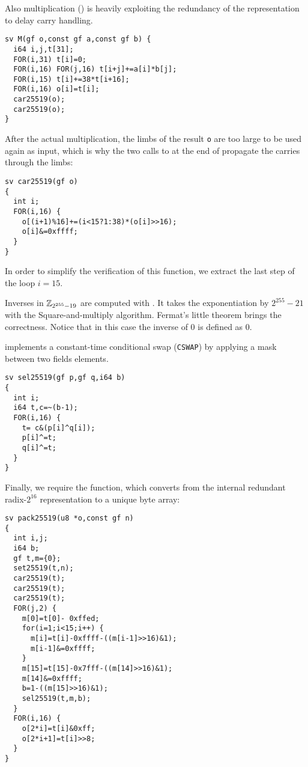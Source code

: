 Also multiplication () is heavily exploiting the redundancy
of the representation to delay carry handling.
\begin{lstlisting}[language=Ctweetnacl]
sv M(gf o,const gf a,const gf b) {
  i64 i,j,t[31];
  FOR(i,31) t[i]=0;
  FOR(i,16) FOR(j,16) t[i+j]+=a[i]*b[j];
  FOR(i,15) t[i]+=38*t[i+16];
  FOR(i,16) o[i]=t[i];
  car25519(o);
  car25519(o);
}
\end{lstlisting}

After the actual multiplication, the limbs of the result \texttt{o} are
too large to be used again as input, which is why the two calls to
 at the end of  propagate the carries through the limbs:
\begin{lstlisting}[language=Ctweetnacl]
sv car25519(gf o)
{
  int i;
  FOR(i,16) {
    o[(i+1)%16]+=(i<15?1:38)*(o[i]>>16);
    o[i]&=0xffff;
  }
}
\end{lstlisting}

In order to simplify the verification of this function,
we extract the last step of the loop $i = 15$.

Inverses in $\mathbb{Z}_{2^{255}-19}$ are computed with .
It takes the exponentiation by $2^{255}-21$ with the Square-and-multiply algorithm.
Fermat's little theorem brings the correctness.
Notice that in this case the inverse of $0$ is defined as $0$.

 implements a constant-time conditional swap (\texttt{CSWAP}) by
applying a mask between two fields elements.
\begin{lstlisting}[language=Ctweetnacl]
sv sel25519(gf p,gf q,i64 b)
{
  int i;
  i64 t,c=~(b-1);
  FOR(i,16) {
    t= c&(p[i]^q[i]);
    p[i]^=t;
    q[i]^=t;
  }
}
\end{lstlisting}

Finally, we require the  function,
which converts from the internal redundant radix-$2^{16}$
representation to a unique byte array:
\begin{lstlisting}[language=Ctweetnacl]
sv pack25519(u8 *o,const gf n)
{
  int i,j;
  i64 b;
  gf t,m={0};
  set25519(t,n);
  car25519(t);
  car25519(t);
  car25519(t);
  FOR(j,2) {
    m[0]=t[0]- 0xffed;
    for(i=1;i<15;i++) {
      m[i]=t[i]-0xffff-((m[i-1]>>16)&1);
      m[i-1]&=0xffff;
    }
    m[15]=t[15]-0x7fff-((m[14]>>16)&1);
    m[14]&=0xffff;
    b=1-((m[15]>>16)&1);
    sel25519(t,m,b);
  }
  FOR(i,16) {
    o[2*i]=t[i]&0xff;
    o[2*i+1]=t[i]>>8;
  }
}
\end{lstlisting}

